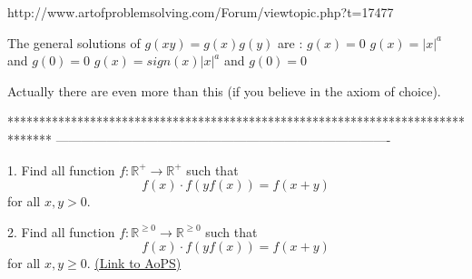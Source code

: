 \begin{solution}
	http://www.artofproblemsolving.com/Forum/viewtopic.php?t=17477
\end{solution}



\begin{solution}
	\begin{tcolorbox}The general solutions of $g(xy)=g(x)g(y)$ are :
$g(x)=0$
$g(x)=|x|^a$ and $g(0)=0$
$g(x)=sign(x)|x|^a$ and $g(0)=0$\end{tcolorbox}  Actually there are even more than this (if you believe in the axiom of choice).
\end{solution}



*******************************************************************************
-------------------------------------------------------------------------------

\begin{problem}
	1. Find all function $f: \mathbb R^{+} \to \mathbb R^{+}$ such that \[f(x) \cdot f(yf(x))=f(x+y)\]for all $x,y>0$.

2. Find all function $f: \mathbb R^{\geq 0} \to \mathbb R^{\geq 0}$ such that \[f(x) \cdot f(yf(x))=f(x+y)\]for all $x,y \geq 0$.
	\flushright \href{https://artofproblemsolving.com/community/c6h405083}{(Link to AoPS)}
\end{problem}




